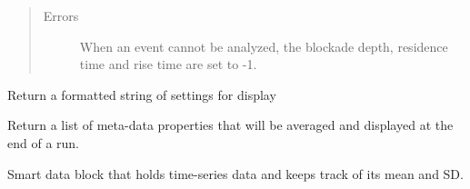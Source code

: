 \documentclass[letterpaper,10pt,english]{sphinxmanual}
\begin{document}
\begin{fulllineitems}
\begin{quote}
\begin{description}
\begin{description}
\end{description}

\item[{Errors}] \leavevmode
When an event cannot be analyzed, the blockade depth, residence time and rise time are set to -1.

\end{description}\end{quote}

\begin{fulllineitems}
\label{api-doc/mosaic.processing:mosaic.adept2State.adept2State.formatsettings}
Return a formatted string of settings for display

\end{fulllineitems}


\begin{fulllineitems}
\label{api-doc/mosaic.processing:mosaic.adept2State.adept2State.mdAveragePropertiesList}
Return a list of meta-data properties that will be averaged 
and displayed at the end of a run.

\end{fulllineitems}


\end{fulllineitems}


\begin{fulllineitems}
\label{api-doc/mosaic.processing:mosaic.adept2State.datblock}
Smart data block that holds time-series data and keeps track
of its mean and SD.

\end{fulllineitems}
\end{document}
